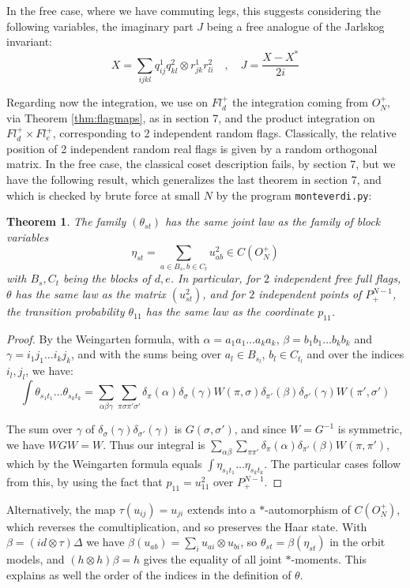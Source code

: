 \documentclass[11pt]{article}
\theoremstyle{plain}
\newtheorem{theorem}{Theorem}[section]
\begin{document}
In the free case, where we have commuting legs, this suggests considering the following variables, the imaginary part $J$ being a free analogue of the Jarlskog invariant:
$$X=\sum_{ijkl}q^1_{ij}q^2_{kl}\otimes r^1_{jk}r^2_{li}\quad,\quad J=\frac{X-X^*}{2i}$$


Regarding now the integration, we use on $Fl^+_d$ the integration coming from $O_N^+$, via Theorem \ref{thm:flagmaps}, as in section 7, and the product integration on $Fl^+_d\times Fl^+_e$, corresponding to 2 independent random flags. Classically, the relative position of 2 independent random real flags is given by a random orthogonal matrix. In the free case, the classical coset description fails, by section 7, but we have the following result, which generalizes the last theorem in section 7, and which is checked by brute force at small $N$ by the program {\tt monteverdi.py}:

\begin{theorem}
\label{thm:transitionlaw}
The family $(\theta_{st})$ has the same joint law as the family of block variables
$$\eta_{st}=\sum_{a\in B_s,b\in C_t}u_{ab}^2\in C(O_N^+)$$
with $B_s,C_t$ being the blocks of $d,e$. In particular, for $2$ independent free full flags, $\theta$ has the same law as the matrix $(u_{st}^2)$, and for $2$ independent points of $P^{N-1}_+$, the transition probability $\theta_{11}$ has the same law as the coordinate $p_{11}$.
\end{theorem}

\begin{proof}
By the Weingarten formula, with $\alpha=a_1a_1\ldots a_ka_k$, $\beta=b_1b_1\ldots b_kb_k$ and $\gamma=i_1j_1\ldots i_kj_k$, and with the sums being over $a_l\in B_{s_l}$, $b_l\in C_{t_l}$ and over the indices $i_l,j_l$, we have:
$$\int\theta_{s_1t_1}\ldots\theta_{s_kt_k}=\sum_{\alpha\beta\gamma}\sum_{\pi\sigma\pi'\sigma'}\delta_\pi(\alpha)\delta_\sigma(\gamma)W(\pi,\sigma)\delta_{\pi'}(\beta)\delta_{\sigma'}(\gamma)W(\pi',\sigma')$$

The sum over $\gamma$ of $\delta_\sigma(\gamma)\delta_{\sigma'}(\gamma)$ is $G(\sigma,\sigma')$, and since $W=G^{-1}$ is symmetric, we have $WGW=W$. Thus our integral is $\sum_{\alpha\beta}\sum_{\pi\pi'}\delta_\pi(\alpha)\delta_{\pi'}(\beta)W(\pi,\pi')$, which by the Weingarten formula equals $\int\eta_{s_1t_1}\ldots\eta_{s_kt_k}$. The particular cases follow from this, by using the fact that $p_{11}=u_{11}^2$ over $P^{N-1}_+$.
\end{proof}

Alternatively, the map $\tau(u_{ij})=u_{ji}$ extends into a $*$-automorphism of $C(O_N^+)$, which reverses the comultiplication, and so preserves the Haar state. With $\beta=(id\otimes\tau)\Delta$ we have $\beta(u_{ab})=\sum_iu_{ai}\otimes u_{bi}$, so $\theta_{st}=\beta(\eta_{st})$ in the orbit models, and $(h\otimes h)\beta=h$ gives the equality of all joint $*$-moments. This explains as well the order of the indices in the definition of $\theta$.
\end{document}
